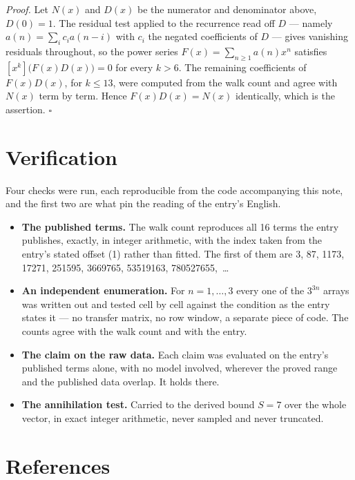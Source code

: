 \documentclass[11pt]{article}
\theoremstyle{definition}
\begin{document}
{\itshape Proof.} Let $N(x)$ and $D(x)$ be the numerator and denominator above, $D(0)=1$. The residual test applied to the recurrence read off $D$ --- namely $a(n) = \sum_i c_i a(n-i)$ with $c_i$ the negated coefficients of $D$ --- gives vanishing residuals throughout, so the power series $F(x)=\sum_{n\ge 1}a(n)x^n$ satisfies $[x^k]\bigl(F(x)D(x)\bigr) = 0$ for every $k > 6$. The remaining coefficients of $F(x)D(x)$, for $k \le 13$, were computed from the walk count and agree with $N(x)$ term by term. Hence $F(x)D(x) = N(x)$ identically, which is the assertion. $\square$

\section{Verification}

Four checks were run, each reproducible from the code accompanying this note, and the first two are what pin the reading of the entry's English.

\begin{itemize}

\item {\bfseries The published terms.} The walk count reproduces all 16 terms the entry publishes, exactly, in integer arithmetic, with the index taken from the entry's stated offset (1) rather than fitted. The first of them are 3, 87, 1173, 17271, 251595, 3669765, 53519163, 780527655,~\dots

\item {\bfseries An independent enumeration.} For $n = 1,\dots,3$ every one of the $3^{3n}$ arrays was written out and tested cell by cell against the condition as the entry states it --- no transfer matrix, no row window, a separate piece of code. The counts agree with the walk count and with the entry.

\item {\bfseries The claim on the raw data.} Each claim was evaluated on the entry's published terms alone, with no model involved, wherever the proved range and the published data overlap. It holds there.

\item {\bfseries The annihilation test.} Carried to the derived bound $S = 7$ over the whole vector, in exact integer arithmetic, never sampled and never truncated.

\end{itemize}

\section{References}
\end{document}
